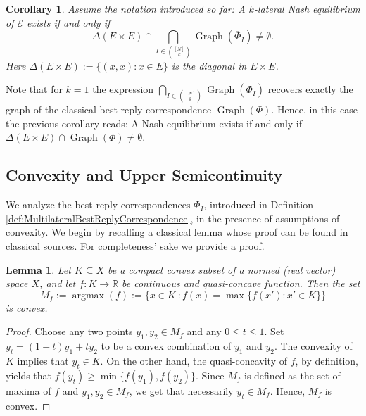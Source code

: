 \documentclass[a4paper,11pt,reqno,english]{amsart}
\theoremstyle{plain}
\newtheorem{lemma}[theorem]{Lemma}
\newtheorem{corollary}[theorem]{Corollary}
\theoremstyle{definition}
\newcommand\R{\mathbb{R}}
\newcommand{\Ecal}{\mathcal{E}}
\begin{document}
\begin{corollary}\label{cor:SimultaneousCoincidenceWithDiagonal}
	Assume the notation introduced so far: A $k$-lateral Nash equilibrium of $\Ecal$ exists if and only if
	\begin{displaymath}
		\Delta(E\times E)\cap \bigcap_{I\in \binom{[N]}{k}} \operatorname{Graph}(\overline{\Phi}_I) \neq \emptyset.
	\end{displaymath}
	Here $\Delta(E\times E):=\{(x,x)\colon x\in E\}$ is the diagonal in $E\times E$.
\end{corollary}

\medskip
Note that for $k=1$ the expression $\bigcap_{I\in \binom{[N]}{k}} \operatorname{Graph}(\overline{\Phi}_I)$ recovers exactly the graph of the classical best-reply correspondence $\operatorname{Graph}(\Phi)$. Hence, in this case the previous corollary reads: A Nash equilibrium exists if and only if $\Delta(E\times E)\cap \operatorname{Graph}(\Phi) \neq \emptyset$.


\subsection{Convexity and Upper Semicontinuity}
We analyze the best-reply correspondences $\Phi_I$, introduced in Definition  \ref{def:MultilateralBestReplyCorrespondence}, in the presence of assumptions of convexity.
We begin by recalling a classical lemma whose proof can be found in classical sources.
For completeness' sake we provide a proof.

\begin{lemma}\label{lem:QuasiConcaveMaximumSet}
	Let $K\subseteq X$ be a compact convex subset of a normed (real vector) space $X$, and let $f\colon K\longrightarrow\R$ be continuous and quasi-concave function.
	Then the set
	\begin{displaymath}
		M_f := \operatorname{argmax}(f) := \big\{x\in K\ : f(x)=\max\{f(x') : x'\in K\} \big\}
	\end{displaymath}
	is convex.
\end{lemma}

\begin{proof}
	Choose any two points $y_1, y_2\in M_f$ and any $0\leq t\leq 1$.
	Set $y_t=(1-t)y_1+ty_2$ to be a convex combination of $y_1$ and $y_2$.
	The convexity of $K$ implies that $y_t\in K$.
	On the other hand, the quasi-concavity of $f$, by definition, yields that $f(y_t)\geq \min\{f(y_1),f(y_2)\}$.
	Since $M_f$ is defined as the set of maxima of $f$ and $y_1,y_2\in M_f$, we get that necessarily $y_t\in  M_f$.
	Hence, $M_f$ is convex.
\end{proof}
\end{document}
